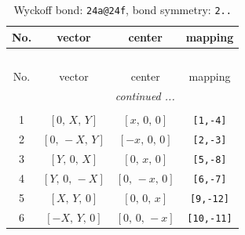 \documentclass[fleqn,8pt]{jsarticle}
\begin{document}
\begin{longtable}{cccc}
\caption{Wyckoff bond: {\tt 24a@24f}, bond symmetry: {\tt 2..}}
 \\
 \hline \hline
No. & vector & center & mapping \\ \hline \endfirsthead

\multicolumn{3}{l}{\tablename\ \thetable{}} \\
 \hline \hline
No. & vector & center & mapping \\ \hline \endhead

 \hline \hline
\multicolumn{3}{r}{\footnotesize\it continued ...} \\ \endfoot

 \hline \hline
\multicolumn{3}{r}{} \\ \endlastfoot

1 & $\left[ 0,\, X,\, Y \right]$ & $\left[ x,\, 0,\, 0 \right]$ & {\tt [1,-4]} \\ \hline
2 & $\left[ 0,\, - X,\, Y \right]$ & $\left[ - x,\, 0,\, 0 \right]$ & {\tt [2,-3]} \\ \hline
3 & $\left[ Y,\, 0,\, X \right]$ & $\left[ 0,\, x,\, 0 \right]$ & {\tt [5,-8]} \\ \hline
4 & $\left[ Y,\, 0,\, - X \right]$ & $\left[ 0,\, - x,\, 0 \right]$ & {\tt [6,-7]} \\ \hline
5 & $\left[ X,\, Y,\, 0 \right]$ & $\left[ 0,\, 0,\, x \right]$ & {\tt [9,-12]} \\ \hline
6 & $\left[ - X,\, Y,\, 0 \right]$ & $\left[ 0,\, 0,\, - x \right]$ & {\tt [10,-11]} \\
\end{longtable}
\renewcommand{\arraystretch}{1.2}
\end{document}
